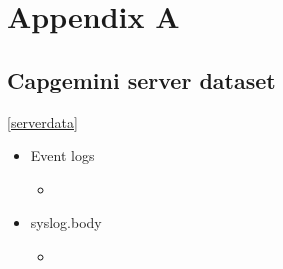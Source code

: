 \chapter{Appendix A} \label{ch:appendices}

\section{Capgemini server dataset}\ref{serverdata}

\begin{itemize}
  \item Event logs 
  \begin{itemize}
      \item 
  \end{itemize}
  \item syslog.body
  \begin{itemize}
      \item 
  \end{itemize}
\end{itemize}

